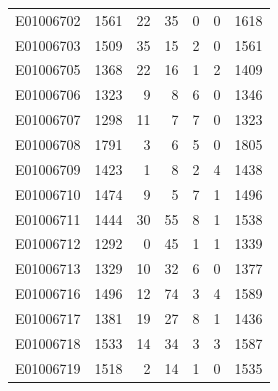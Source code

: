 \documentclass[
  letterpaper,
  DIV=11,
  numbers=noendperiod]{scrreprt}
\begin{document}
\begin{tabular}{lrrrrrr}
E01006702     &    1561 &      22 &                    35 &                               0 &                       0 &              1618 \\
E01006703     &    1509 &      35 &                    15 &                               2 &                       0 &              1561 \\
E01006705     &    1368 &      22 &                    16 &                               1 &                       2 &              1409 \\
E01006706     &    1323 &       9 &                     8 &                               6 &                       0 &              1346 \\
E01006707     &    1298 &      11 &                     7 &                               7 &                       0 &              1323 \\
E01006708     &    1791 &       3 &                     6 &                               5 &                       0 &              1805 \\
E01006709     &    1423 &       1 &                     8 &                               2 &                       4 &              1438 \\
E01006710     &    1474 &       9 &                     5 &                               7 &                       1 &              1496 \\
E01006711     &    1444 &      30 &                    55 &                               8 &                       1 &              1538 \\
E01006712     &    1292 &       0 &                    45 &                               1 &                       1 &              1339 \\
E01006713     &    1329 &      10 &                    32 &                               6 &                       0 &              1377 \\
E01006716     &    1496 &      12 &                    74 &                               3 &                       4 &              1589 \\
E01006717     &    1381 &      19 &                    27 &                               8 &                       1 &              1436 \\
E01006718     &    1533 &      14 &                    34 &                               3 &                       3 &              1587 \\
E01006719     &    1518 &       2 &                    14 &                               1 &                       0 &              1535 \\

\end{tabular}
\end{document}
